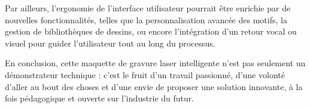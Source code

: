 Par ailleurs, l’ergonomie de l’interface utilisateur pourrait être enrichie par de nouvelles fonctionnalités, telles que la personnalisation avancée des motifs, la gestion de bibliothèques de dessins, ou encore l’intégration d’un retour vocal ou visuel pour guider l’utilisateur tout au long du processus.

En conclusion, cette maquette de gravure laser intelligente n'est pas seulement un démonstrateur technique : c'est le fruit d'un travail passionné, d'une volonté d'aller au bout des choses et d'une envie de proposer une solution innovante, à la fois pédagogique et ouverte sur l'industrie du futur.

\vspace*{2cm}
\begin{flushright}
\makeatletter\@author\makeatother

\begin{minipage}{5cm}
    \printsignature
\end{minipage}
\end{flushright}